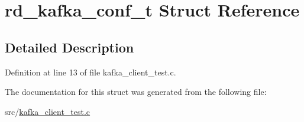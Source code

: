 \hypertarget{structrd__kafka__conf__t}{\section{rd\-\_\-kafka\-\_\-conf\-\_\-t \-Struct \-Reference}
\label{structrd__kafka__conf__t}
}


\subsection{\-Detailed \-Description}


\-Definition at line 13 of file kafka\-\_\-client\-\_\-test.\-c.



\-The documentation for this struct was generated from the following file\-:\begin{DoxyCompactItemize}
\item 
src/\hyperlink{kafka__client__test_8c}{kafka\-\_\-client\-\_\-test.\-c}\end{DoxyCompactItemize}
